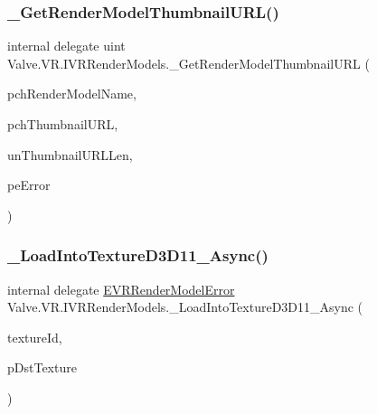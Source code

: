 \mbox{\label{struct_valve_1_1_v_r_1_1_i_v_r_render_models_afd1ebaace88f5874dc31699503bba86e}} 
\subsubsection{\texorpdfstring{\_GetRenderModelThumbnailURL()}{\_GetRenderModelThumbnailURL()}}
{\footnotesize\ttfamily internal delegate uint Valve.\+V\+R.\+I\+V\+R\+Render\+Models.\+\_\+\+Get\+Render\+Model\+Thumbnail\+U\+RL (\begin{DoxyParamCaption}\item[{string}]{pch\+Render\+Model\+Name,  }\item[{System.\+Text.\+String\+Builder}]{pch\+Thumbnail\+U\+RL,  }\item[{uint}]{un\+Thumbnail\+U\+R\+L\+Len,  }\item[{ref \mbox{\hyperlink{namespace_valve_1_1_v_r_ac95dda09bbb588fd83a8ac0ba3c82266}{E\+V\+R\+Render\+Model\+Error}}}]{pe\+Error }\end{DoxyParamCaption})}

\mbox{\label{struct_valve_1_1_v_r_1_1_i_v_r_render_models_a819d498723194d075a7e114272dce441}} 
\subsubsection{\texorpdfstring{\_LoadIntoTextureD3D11\_Async()}{\_LoadIntoTextureD3D11\_Async()}}
{\footnotesize\ttfamily internal delegate \mbox{\hyperlink{namespace_valve_1_1_v_r_ac95dda09bbb588fd83a8ac0ba3c82266}{E\+V\+R\+Render\+Model\+Error}} Valve.\+V\+R.\+I\+V\+R\+Render\+Models.\+\_\+\+Load\+Into\+Texture\+D3\+D11\+\_\+\+Async (\begin{DoxyParamCaption}\item[{int}]{texture\+Id,  }\item[{Int\+Ptr}]{p\+Dst\+Texture }\end{DoxyParamCaption})}

